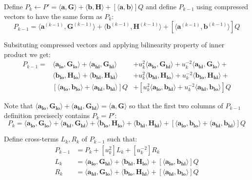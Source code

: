 \documentclass[../lecture-notes-148x210.tex]{subfiles}
\begin{document}
Define $P_k \gets P' =  \langle \mathbf{a,G} \rangle + \langle \mathbf{b,H} \rangle + [\langle \mathbf{a,b} \rangle]Q$ and define $P_{k-1}$ using compressed vectors to have the same form as $P_k$:
$$P_{k-1} = \langle \mathbf{a}^{(k-1)}, \mathbf{G}^{(k-1)} \rangle + \langle \mathbf{b}^{(k-1)}, \mathbf{H}^{(k-1)} \rangle + [\langle \mathbf{a}^{(k-1)}, \mathbf{b}^{(k-1)} \rangle]Q $$

Subsituting compressed vectors and applying bilinearity property of inner product we get:
\begin{align}
    P_{k-1} = & \langle \mathbf{a_{lo}}, \mathbf{G_{lo}}\rangle + \langle \mathbf{a_{hi}}, \mathbf{G_{hi}}\rangle &+ u_k^2\langle \mathbf{a_{lo}}, \mathbf{G_{hi}}\rangle + u_k^{-2}\langle \mathbf{a_{hi}}, \mathbf{G_{lo}}\rangle + \\
    & \langle \mathbf{b_{lo}}, \mathbf{H_{lo}}\rangle + \langle \mathbf{b_{hi}}, \mathbf{H_{hi}}\rangle &+ u_k^2\langle \mathbf{b_{hi}}, \mathbf{H_{lo}}\rangle + u_k^{-2}\langle \mathbf{b_{lo}}, \mathbf{H_{hi}}\rangle + \\
    & [\langle \mathbf{a_{lo}}, \mathbf{b_{lo}}\rangle + \langle \mathbf{a_{hi}}, \mathbf{b_{hi}}\rangle]Q &+ [u_k^2\langle \mathbf{a_{lo}}, \mathbf{b_{hi}}\rangle + u_k^{-2}\langle \mathbf{a_{hi}}, \mathbf{b_{lo}}\rangle]Q
\end{align}

Note that $\langle \mathbf{a_{lo}}, \mathbf{G_{lo}}\rangle + \langle \mathbf{a_{hi}}, \mathbf{G_{hi}}\rangle = \langle \mathbf{a,G}\rangle$ so that the first two columns of $P_{k-1}$ definition precisecly contains $P_{k} = P'$:
$$P_{k} = \langle \mathbf{a_{lo}}, \mathbf{G_{lo}}\rangle + \langle \mathbf{a_{hi}}, \mathbf{G_{hi}}\rangle + \langle \mathbf{b_{lo}}, \mathbf{H_{lo}}\rangle + \langle \mathbf{b_{hi}}, \mathbf{H_{hi}}\rangle + [\langle \mathbf{a_{lo}}, \mathbf{b_{lo}}\rangle + \langle \mathbf{a_{hi}}, \mathbf{b_{hi}}\rangle]Q$$

Define cross-terms $L_k, R_k$ of $P_{k-1}$ such that:
\begin{align}
    P_{k-1} &= P_k + [u_k^2] L_k + [u_k^{-2}] R_k \\
    L_{k} &= \langle \mathbf{a_{lo}}, \mathbf{G_{hi}}\rangle + \langle \mathbf{b_{hi}}, \mathbf{H_{lo}}\rangle + [\langle \mathbf{a_{lo}}, \mathbf{b_{hi}}\rangle]Q \\
    R_{k} &= \langle \mathbf{a_{hi}}, \mathbf{G_{lo}}\rangle + \langle \mathbf{b_{lo}}, \mathbf{H_{hi}}\rangle + [\langle \mathbf{a_{hi}}, \mathbf{b_{lo}}\rangle]Q
\end{align}
\end{document}
